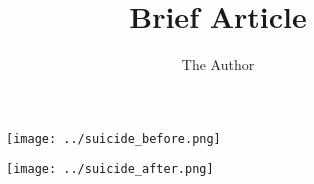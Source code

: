 \documentclass[11pt, oneside]{article}   	%
\title{Brief Article}
\author{The Author}
\begin{document}
\maketitle

 \begin{figure}[h]
 \texttt{[image: ../suicide\_before.png]}
 \centering
 \end{figure}

 \begin{figure}[h]
 \texttt{[image: ../suicide\_after.png]}
 \centering
 \end{figure}
\end{document}

